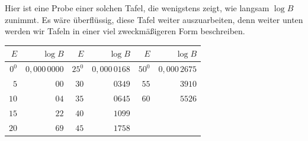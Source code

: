 Hier ist eine Probe einer solchen Tafel, die wenigstens zeigt, wie langsam $\log B$ zunimmt. Es wäre überflüssig, diese Tafel weiter auszuarbeiten, denn weiter unten werden wir Tafeln in einer viel zweckmäßigeren Form beschreiben.
\begin{center}
\begin{tabular}{|r|r||r|r||r|r|}
\hline
$E$ & $\log B$ & $E$ & $\log B$ & $E$ & $\log B$\\
\hline
$0^0$ & $0{,}000\,0000$ & $25^0$ & $0{,}000\,0168$ & $50^0$ & $0{,}000\,2675$\\
$5$ & $00$ & $30$ & $0349$ & $55$ & $3910$\\
$10$ & $04$ & $35$ & $0645$ & $60$ & $5526$\\
$15$ & $22$ & $40$ & $1099$ & & \\
$20$ & $69$ & $45$ & $1758$ & & \\
\hline
\end{tabular}
\end{center}
